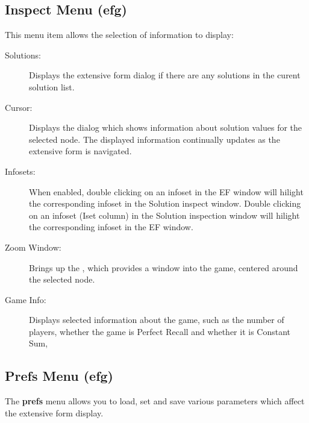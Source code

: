 \subsection{Inspect Menu (efg)}\label{efinspect}

This menu item allows the selection of information to display:

\begin{description}
\item[Solutions:] Displays the extensive form  dialog if there are any solutions in
the curent solution list.
\item[Cursor:] Displays the  dialog
which shows information about solution values for the selected
node. The displayed information continually updates as the extensive
form is navigated.
\item[Infosets:] When enabled, double clicking on an infoset in the EF
window will hilight the corresponding infoset in the Solution inspect
window.  Double clicking on an infoset (Iset column) in the Solution
inspection window will hilight the corresponding infoset in the EF
window.
\item[Zoom Window:] Brings up the ,
which provides a window into the game, centered around the selected
node.
\item[Game Info:] Displays selected information about the game, such
as the number of players, whether the game is Perfect Recall and
whether it is Constant Sum,
\end{description}

\subsection{Prefs Menu (efg)}\label{displaymenu}

The {\bf prefs} menu allows you to load, set and save various
parameters which affect the extensive form display.

